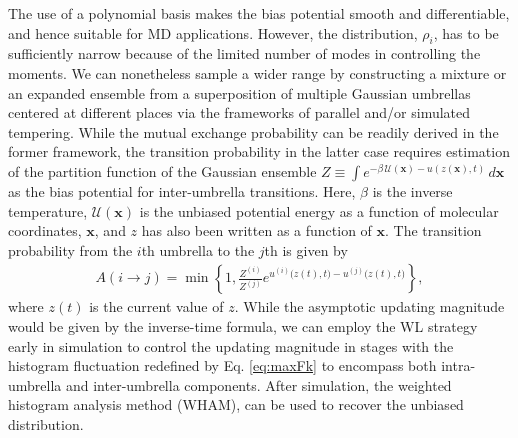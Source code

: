 \documentclass[preprint, superscriptaddress, floatfix]{revtex4-1}
\begin{document}
The use of a polynomial basis makes
the bias potential smooth and differentiable,
and hence suitable for MD applications.
%
However,
the distribution, $\rho_i$,
has to be sufficiently narrow
because of the limited number of modes
in controlling the moments.
%
We can nonetheless sample a wider range
by constructing a mixture\cite{shirts2017}
or an expanded ensemble
from a superposition of multiple Gaussian umbrellas
centered at different places via
the frameworks of
parallel\cite{swendsen1986,
  *geyer1991, *hukushima1996, *hansmann1997, *sugita1999,
  *earl2005, *zuckerman2011, *rauscher2009, kim2010}
and/or simulated tempering\cite{marinari1992,
  *lyubartsev1992, li2007,
  park2007, *nguyen2013, *zhang2015st}.
%
While the mutual exchange probability
can be readily derived in the former
framework\cite{neuhaus2006, *neuhaus2007, kim2010},
the transition probability in the latter case
requires estimation of the partition function
of the Gaussian ensemble
$Z \equiv \int e^{-\beta \, \mathcal U(\mathbf x)-u(z(\mathbf x),t)} \, d\mathbf x$
as the bias potential for inter-umbrella transitions.
%
Here,
$\beta$ is the inverse temperature,
$\mathcal U(\mathbf x)$ is the unbiased potential energy
as a function of molecular coordinates, $\mathbf x$,
and $z$ has also been written as a function of $\mathbf x$.
%
The transition probability from
the $i$th umbrella to the $j$th is given by
\begin{align*}
A(i\to j) =
\min\left\{1,
  \frac{Z^{(i)}}{Z^{(j)}}
  e^{
    u^{(i)}\bigl( z(t), t \bigr)
    - u^{(j)}\bigl( z(t), t \bigr)
    }
  \right\}
  ,
\end{align*}
where $z(t)$ is the current value of $z$.
%
While the asymptotic updating magnitude
would be given by the inverse-time formula,
we can employ the WL strategy early in simulation
to control the updating magnitude in stages
with the histogram fluctuation
redefined by Eq. \eqref{eq:maxFk}
to encompass both intra-umbrella and inter-umbrella
components.
%
After simulation,
the weighted histogram analysis method
(WHAM)\cite{ferrenberg1988, *ferrenberg1989,
*kumar1992, *roux1995, *bartels1997, *souaille2001,
*kobrak2003, *gallicchio2005, *chodera2007,
*fenwick2008, *kim2011, *shirts2008,
zhu2012, newman, frenkel},
can be used to recover the unbiased distribution.
%
\end{document}
